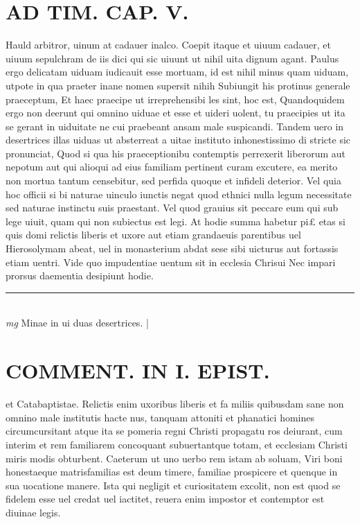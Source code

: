 \documentclass{article}
\begin{document}
\begin{pages}
\section*{AD TIM. CAP. V. }
\marginpar{[ p.151 ]}\pstart Hauld arbitror, uinum at cadauer inalco. Coepit itaque et uiuum cadauer, et uiuum sepulchram de iis dici qui sic uiuunt ut nihil uita dignum agant. Paulus ergo delicatam uiduam iudicauit esse mortuam, id est nihil minus quam uiduam, utpote in qua praeter inane nomen supersit nihih Subiungit his protinus generale praeceptum, Et haec praecipe ut irreprehensibi les sint, hoc est, Quandoquidem ergo non deerunt qui omnino uiduae et esse et uideri uolent, tu praecipies ut ita se gerant in uiduitate ne cui praebeant ansam male suspicandi. Tandem uero in desertrices illas uiduas ut absterreat a uitae instituto inhonestissimo di stricte sic pronunciat, Quod si qua his praeceptionibu contemptis perrexerit liberorum aut nepotum aut qui alioqui ad eius familiam pertinent curam excutere, ea merito non mortua tantum censebitur, sed perfida quoque et infideli deterior. Vel quia hoc officii si bi naturae uinculo iunctis negat quod ethnici nulla legum necessitate sed naturae instinctu suis praestant. Vel quod grauius sit peccare eum qui sub lege uiuit, quam qui non subiectus est legi. At hodie summa habetur pi£ etas si quis domi relictis liberis et uxore aut etiam grandaeuis parentibus uel Hierosolymam abeat, uel in monasterium abdat sese sibi uicturus aut fortassis etiam uentri. Vide quo impudentiae uentum sit in ecclesia Chrisui Nec impari prorsus daementia desipiunt hodie.  \pend
\vspace{0.5cm}\noindent
\vspace{0.2cm}\rule{1cm}{0.2pt}\\ 
\hspace{0.2cm}\textit{mg}
\footnotesize Minae in ui duas desertrices. 
\normalsize| 
\section*{COMMENT. IN I. EPIST. }\pstart et Catabaptistae. Relictis enim uxoribus liberis et fa miliis quibusdam sane non omnino male institutis hacte nus, tanquam attoniti et phanatici homines circumcursitant atque ita se pomeria regni Christi propagatu ros deiurant, cum interim et rem familiarem concoquant subuertantque totam, et ecclesiam Christi miris modis obturbent. Caeterum ut uno uerbo rem istam ab soluam, Viri boni honestaeque matrisfamilias est deum timere, familiae prospicere et quenque in sua uocatione manere. Ista qui negligit et curiositatem excolit, non est quod se fidelem esse uel credat uel iactitet, reuera enim impostor et contemptor est diuinae legis.  \pend
{}
{}

\end{pages}
\end{document}
